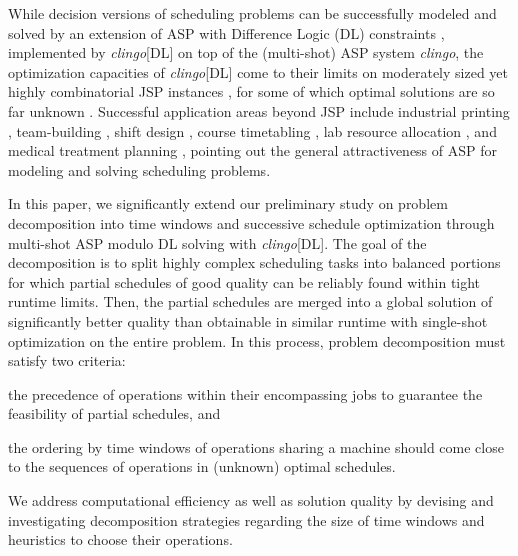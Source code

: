 \documentclass{tlp} %
\newcommand{\clingo}{\emph{clingo}\xspace}
\newcommand{\clingodl}{\emph{clingo}[DL]\xspace}
\begin{document}

While decision versions of scheduling problems can be successfully modeled and
solved by an extension of ASP with Difference Logic (DL) constraints
\citep{gebser2016theory}, implemented by \clingodl on top of the
(multi-shot) ASP system \clingo \citep{gekakasc17a},
the optimization capacities of \clingodl come to their limits on moderately sized
yet highly combinatorial JSP instances \citep{elkgeb20a}, for some of which optimal solutions are so far unknown \citep{shysha18a}.
Successful application areas beyond JSP include 
industrial printing \citep{balduccini11a},
team-building \citep{rigralmaliiile12a},
shift design \citep{abseher2016shift},
course timetabling \citep{bainkaokscsotawa18a},
lab resource allocation \citep{francescutto2021solving},
and
medical treatment planning \citep{dogagrmamopo21a},
pointing out the general attractiveness of ASP for modeling and solving scheduling problems.

In this paper, we significantly extend our preliminary study \citep{elkgeb20a} 
on problem decomposition into time windows and successive schedule optimization
through multi-shot ASP modulo DL solving with \clingodl.
The goal of the decomposition is to split highly complex scheduling tasks into
balanced portions for which partial schedules of good quality can be reliably
found within tight runtime limits. Then, the partial schedules are merged into a global solution of significantly better quality than obtainable in similar runtime with single-shot optimization on the entire problem.
In this process, problem decomposition must satisfy two criteria: 
\begin{enumerate*}[label=\emph{(\roman*)}]
  \item the precedence of operations within their encompassing jobs to guarantee the feasibility of partial schedules, and 
  \item the ordering by time windows of operations sharing a machine should come close to the sequences of operations in (unknown) optimal schedules.
\end{enumerate*}
We address computational efficiency as well as solution quality by devising and investigating decomposition strategies regarding the size of
time windows and heuristics to choose their operations.
\end{document}
